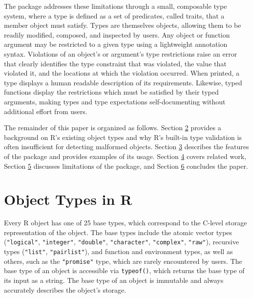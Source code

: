 The  package addresses these limitations through a small, composable type system, where a type is defined as a set of predicates, called traits, that a member object must satisfy. Types are themselves objects, allowing them to be readily modified, composed, and inspected by users. Any object or function argument may be restricted to a given type using a lightweight annotation syntax. Violations of an object's or argument's type restrictions raise an error that clearly identifies the type constraint that was violated, the value that violated it, and the locations at which the violation occurred. When printed, a type displays a human readable description of its requirements. Likewise, typed functions display the restrictions which must be satisfied by their typed arguments, making types and type expectations self-documenting without additional effort from users.

The remainder of this paper is organized as follows. Section \hyperref[sec-object-types]{2} provides a background on R's existing object types and why R's built-in type validation is often insufficient for detecting malformed objects. Section \hyperref[sec-type-package]{3} describes the features of the  package and provides examples of its usage. Section \hyperref[sec-related-work]{4} covers related work, Section \hyperref[sec-limitations]{5} discusses limitations of the package, and Section \hyperref[sec-conclusion]{6} concludes the paper.

\section{Object Types in R}\label{sec-object-types}

Every R object has one of 25 base types, which correspond to the C-level storage representation of the object. The base types include the atomic vector types (\texttt{"logical"}, \texttt{"integer"}, \texttt{"double"}, \texttt{"character"}, \texttt{"complex"}, \texttt{"raw"}), recursive types (\texttt{"list"}, \texttt{"pairlist"}), and function and environment types, as well as others, such as the \texttt{"promise"} type, which are rarely encountered by users. The base type of an object is accessible via \texttt{typeof()}, which returns the base type of its input as a string. The base type of an object is immutable and always accurately describes the object's storage.

